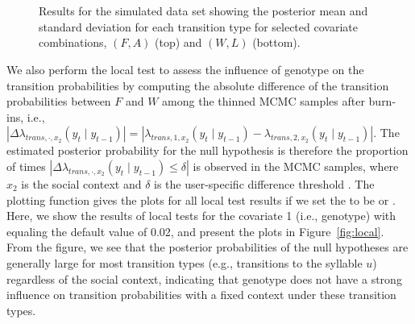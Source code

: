\begin{figure}[!ht]
\centering
{}\\
\\
\caption{Results for the  simulated  data set showing the posterior mean and standard deviation for each transition type for selected covariate combinations, $(F,A)$ (top) and $(W,L)$ (bottom).
 }
\label{fig:post_mean}
\end{figure}

We also perform the local test  to assess the influence of genotype on the transition probabilities by computing the absolute difference of the transition probabilities between $F$ and $W$ among the thinned MCMC samples after burn-ins, i.e., $|\Delta \lambda_{trans,\cdot,x_2}(y_t\mid y_{t-1})|=|\lambda_{trans,1,x_2}(y_t\mid y_{t-1})-\lambda_{trans,2,x_2}(y_t\mid y_{t-1})|$. 
The estimated posterior probability for the null hypothesis is therefore the proportion of times $|\Delta \lambda_{trans,\cdot,x_2}(y_t\mid y_{t-1}) \le \delta|$ is observed in the MCMC samples, 
where $x_2$ is the social context and $\delta$ is the user-specific difference threshold . 
The plotting function  gives the plots for all local test results if we set the  to be  or . 
Here, we show the results of local tests for the covariate 1 (i.e., genotype) with  equaling the default value of 0.02, and present  the plots in Figure~\ref{fig:local}.
{From the figure, we see that the posterior probabilities of the null hypotheses are generally large for most transition types (e.g., transitions to the syllable $u$) regardless of the social context, 
indicating that genotype does not have a strong influence on transition probabilities with a fixed context under these transition types. }


